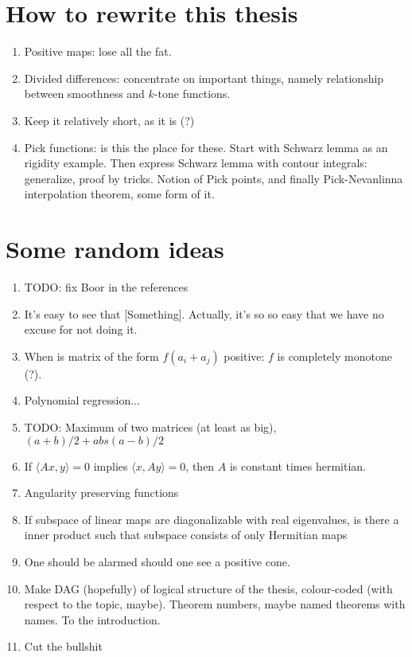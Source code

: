 \section{How to rewrite this thesis}

\begin{enumerate}
	\item Positive maps: lose all the fat.
	\item Divided differences: concentrate on important things, namely relationship between smoothness and $k$-tone functions.
	\item Keep it relatively short, as it is (?)
	\item Pick functions: is this the place for these. Start with Schwarz lemma as an rigidity example. Then express Schwarz lemma with contour integrals: generalize, proof by tricks. Notion of Pick points, and finally Pick-Nevanlinna interpolation theorem, some form of it.
\end{enumerate}

\section{Some random ideas}
\begin{enumerate}
	\item TODO: fix Boor in the references
	\item It's easy to see that [Something]. Actually, it's so so easy that we have no excuse for not doing it.
	\item When is matrix of the form $f(a_{i} + a_{j})$ positive: $f$ is completely monotone (?).
	\item Polynomial regression...
	\item TODO: Maximum of two matrices (at least as big), $(a + b)/2 + abs(a - b)/2$
	\item If $\langle A x, y \rangle = 0$ implies $\langle x, A y \rangle = 0$, then $A$ is constant times hermitian.
	\item Angularity preserving functions
	\item If subspace of linear maps are diagonalizable with real eigenvalues, is there a inner product such that subspace consists of only Hermitian maps
	\item One should be alarmed should one see a positive cone.
	\item Make DAG (hopefully) of logical structure of the thesis, colour-coded (with respect to the topic, maybe). Theorem numbers, maybe named theorems with names. To the introduction.
	\item Cut the bullshit
\end{enumerate}


